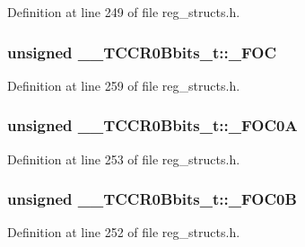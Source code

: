 Definition at line 249 of file reg\+\_\+structs.\+h.

\hypertarget{union_____t_c_c_r0_bbits__t_ac764c3a1780c7eaa7010ac6133d0c1c7}{
\subsubsection[{\+\_\+\+F\+O\+C}]{\setlength{\rightskip}{0pt plus 5cm}unsigned \+\_\+\+\_\+\+T\+C\+C\+R0\+Bbits\+\_\+t\+::\+\_\+\+F\+O\+C}}\label{union_____t_c_c_r0_bbits__t_ac764c3a1780c7eaa7010ac6133d0c1c7}


Definition at line 259 of file reg\+\_\+structs.\+h.

\hypertarget{union_____t_c_c_r0_bbits__t_a679f80d4e26d625bcd03c6a71ee08706}{
\subsubsection[{\+\_\+\+F\+O\+C0\+A}]{\setlength{\rightskip}{0pt plus 5cm}unsigned \+\_\+\+\_\+\+T\+C\+C\+R0\+Bbits\+\_\+t\+::\+\_\+\+F\+O\+C0\+A}}\label{union_____t_c_c_r0_bbits__t_a679f80d4e26d625bcd03c6a71ee08706}


Definition at line 253 of file reg\+\_\+structs.\+h.

\hypertarget{union_____t_c_c_r0_bbits__t_aa0c4ada08d75e0374ca54e10b5bd99c3}{
\subsubsection[{\+\_\+\+F\+O\+C0\+B}]{\setlength{\rightskip}{0pt plus 5cm}unsigned \+\_\+\+\_\+\+T\+C\+C\+R0\+Bbits\+\_\+t\+::\+\_\+\+F\+O\+C0\+B}}\label{union_____t_c_c_r0_bbits__t_aa0c4ada08d75e0374ca54e10b5bd99c3}


Definition at line 252 of file reg\+\_\+structs.\+h.

